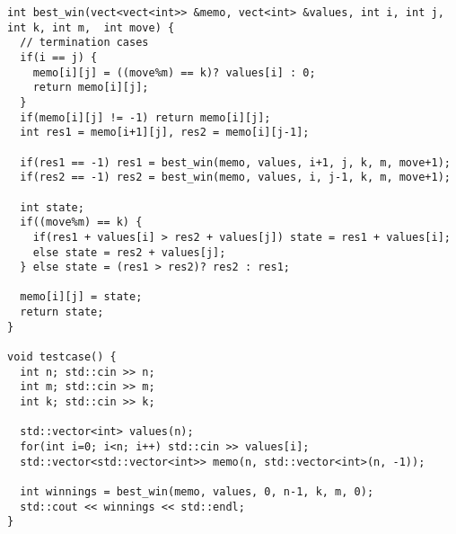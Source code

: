 \documentclass[12pt,letterpaper]{article}
\begin{document}
\begin{verbatim}
int best_win(vect<vect<int>> &memo, vect<int> &values, int i, int j, int k, int m,  int move) {
  // termination cases
  if(i == j) {
    memo[i][j] = ((move%m) == k)? values[i] : 0;
    return memo[i][j];
  }
  if(memo[i][j] != -1) return memo[i][j];
  int res1 = memo[i+1][j], res2 = memo[i][j-1];
  
  if(res1 == -1) res1 = best_win(memo, values, i+1, j, k, m, move+1);
  if(res2 == -1) res2 = best_win(memo, values, i, j-1, k, m, move+1);
  
  int state;
  if((move%m) == k) { 
    if(res1 + values[i] > res2 + values[j]) state = res1 + values[i];
    else state = res2 + values[j];
  } else state = (res1 > res2)? res2 : res1;
  
  memo[i][j] = state;
  return state;
}

void testcase() {
  int n; std::cin >> n;
  int m; std::cin >> m;
  int k; std::cin >> k;
  
  std::vector<int> values(n);
  for(int i=0; i<n; i++) std::cin >> values[i];
  std::vector<std::vector<int>> memo(n, std::vector<int>(n, -1));
  
  int winnings = best_win(memo, values, 0, n-1, k, m, 0);
  std::cout << winnings << std::endl;
}
\end{verbatim}
\end{document}

